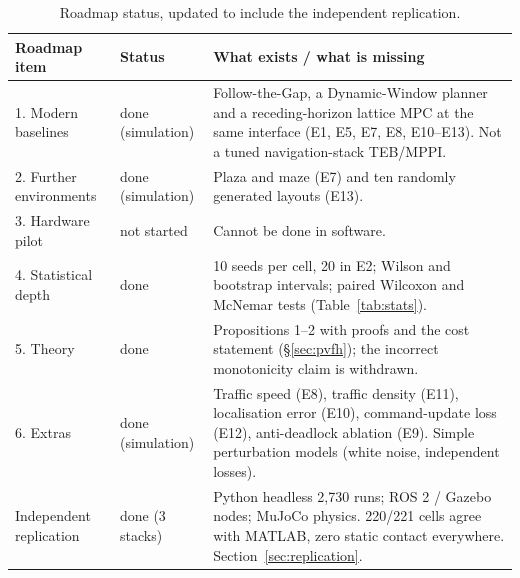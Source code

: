 \begin{table}[H]
\centering\footnotesize
\begin{tabular}{@{}p{4.2cm}p{2.2cm}p{7.6cm}@{}}
\toprule
\textbf{Roadmap item} & \textbf{Status} & \textbf{What exists / what is missing}\\\midrule
1. Modern baselines & done (simulation) & Follow-the-Gap, a Dynamic-Window
planner and a receding-horizon lattice MPC at the same interface (E1, E5,
E7, E8, E10--E13). Not a tuned navigation-stack TEB/MPPI.\\
2. Further environments & done (simulation) & Plaza and maze (E7) and ten
randomly generated layouts (E13).\\
3. Hardware pilot & not started & Cannot be done in software.\\
4. Statistical depth & done & 10 seeds per cell, 20 in E2; Wilson and
bootstrap intervals; paired Wilcoxon and McNemar tests
(Table~\ref{tab:stats}).\\
5. Theory & done & Propositions 1--2 with proofs and the cost statement
(\S\ref{sec:pvfh}); the incorrect monotonicity claim is withdrawn.\\
6. Extras & done (simulation) & Traffic speed (E8), traffic density (E11),
localisation error (E10), command-update loss (E12), anti-deadlock
ablation (E9). Simple perturbation models (white noise, independent
losses).\\
Independent replication & done (3 stacks) & Python headless 2,730 runs;
ROS 2 / Gazebo nodes; MuJoCo physics. 220/221 cells agree with MATLAB,
zero static contact everywhere. Section~\ref{sec:replication}.\\
\bottomrule
\end{tabular}
\caption{Roadmap status, updated to include the independent replication.}
\end{table}

